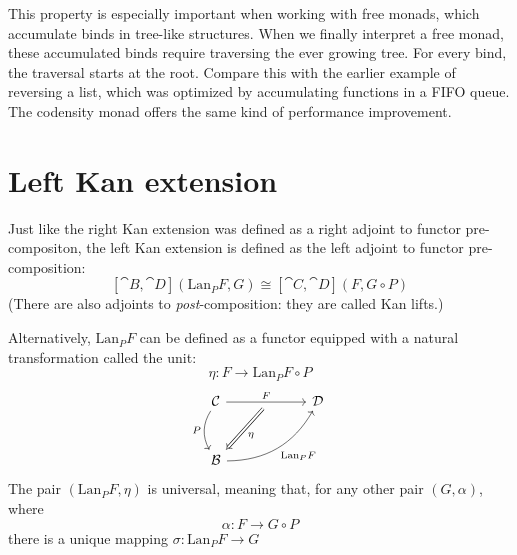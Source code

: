 \documentclass[DaoFP]{subfiles}
\begin{document}
This property is especially important when working with free monads, which accumulate binds in tree-like structures. When we finally interpret a free monad, these accumulated binds require traversing the ever growing tree. For every bind, the traversal starts at the root. Compare this with the earlier example of reversing a list, which was optimized by accumulating functions in a FIFO queue. The codensity monad offers the same kind of performance improvement.

\section{Left Kan extension}

Just like the right Kan extension was defined as a right adjoint to functor pre-compositon, the left Kan extension is defined as the left adjoint to functor pre-composition:
\[ [\cat B, \cat D](\text{Lan}_P F , G) \cong  [\cat C, \cat D] (F, G \circ P) \]
 (There are also adjoints to \emph{post}-composition: they are called Kan lifts.)

Alternatively, $\text{Lan}_P F$ can be defined as a functor equipped with a natural transformation called the unit:
\[ \eta \colon F \to \text{Lan}_P F \circ P \]
\[
 \begin{tikzcd} [row sep=1cm, column sep=1cm]
 \cat C
 \arrow[rr, "F", "" {name=ID, below} ]
 \arrow[d, bend right, "P"']
 && \cat D
 \\
 \cat B
  \arrow[urr, bend right, "\text{Lan}_P F"']
 \arrow[Rightarrow, "\eta",  from=ID]
 \end{tikzcd}
\]
The pair $(\text{Lan}_P F, \eta)$ is universal, meaning that, for any other pair $(G, \alpha)$, where 
\[ \alpha \colon F \to G \circ P\] 
there is a unique mapping $\sigma \colon \text{Lan}_P F \to G$ 
\end{document}
